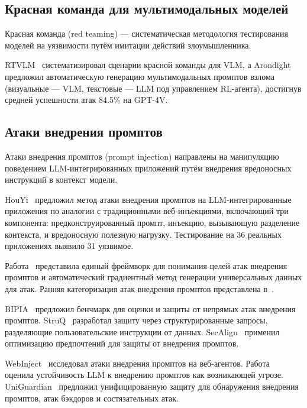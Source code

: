 \subsection{Красная команда для мультимодальных моделей}\label{subsec:red_teaming}

Красная команда (red teaming) --- систематическая методология тестирования моделей на уязвимости путём имитации действий злоумышленника.

RTVLM~\cite{2401.12915} систематизировал сценарии красной команды для VLM, а Arondight~\cite{2407.15050} предложил автоматическую генерацию мультимодальных промптов взлома (визуальные --- VLM, текстовые --- LLM под управлением RL-агента), достигнув средней успешности атак 84.5\% на GPT-4V.

\subsection{Атаки внедрения промптов}\label{subsec:prompt_injection}

Атаки внедрения промптов (prompt injection) направлены на манипуляцию поведением LLM-интегрированных приложений путём внедрения вредоносных инструкций в контекст модели.

HouYi~\cite{2306.05499} предложил метод атаки внедрения промптов на LLM-интегрированные приложения по аналогии с традиционными веб-инъекциями, включающий три компонента: предконструированный промпт, инъекцию, вызывающую разделение контекста, и вредоносную полезную нагрузку. Тестирование на 36 реальных приложениях выявило 31 уязвимое.

Работа~\cite{2403.04957} представила единый фреймворк для понимания целей атак внедрения промптов и автоматический градиентный метод генерации универсальных данных для атак. Ранняя категоризация атак внедрения промптов представлена в~\cite{an-early-categorization-of-prompt-injection-attacks-on-large-language-models}.

BIPIA~\cite{2312.14197} предложил бенчмарк для оценки и защиты от непрямых атак внедрения промптов. StruQ~\cite{2402.06363} разработал защиту через структурированные запросы, разделяющие пользовательские инструкции от данных. SecAlign~\cite{2410.05451} применил оптимизацию предпочтений для защиты от внедрения промптов.

WebInject~\cite{2505.11717} исследовал атаки внедрения промптов на веб-агентов. Работа~\cite{2511.01634} оценила устойчивость LLM к внедрению промптов как возникающей угрозе. UniGuardian~\cite{2502.13141} предложил унифицированную защиту для обнаружения внедрения промптов, атак бэкдоров и состязательных атак.

